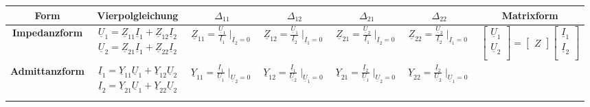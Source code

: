 \begin{table}
	\renewcommand{\arraystretch}{1.1}
	\begin{tabular}{| c | c | c | c | c | c | c |}
		\hline
			\textbf{Form}
			& \textbf{Vierpolgleichung} 
			& \textbf{$\Delta_{11}$} 
			& \textbf{$\Delta_{12}$}
			& \textbf{$\Delta_{21}$}
			& \textbf{$\Delta_{22}$}
			& \textbf{Matrixform}\\
		\hline
			\textbf{Impedanzform}
			& $ \begin{matrix}
					\underline{U}_{1}=\underline{Z}_{11}\underline{I}_{1}+\underline{Z}_{12}\underline{I}_{2}\\
					\underline{U}_{2}=\underline{Z}_{21}\underline{I}_{1}+\underline{Z}_{22}\underline{I}_{2}\\
				\end{matrix}$
			& $\underline{Z}_{11}=\frac{\underline{U}_{1}}{\underline{I}_{1}} \mid_{\underline{I}_2=0}$
			& $\underline{Z}_{12}=\frac{\underline{U}_{1}}{\underline{I}_{2}} \mid_{\underline{I}_1=0}$
			& $\underline{Z}_{21}=\frac{\underline{U}_{2}}{\underline{I}_{1}} \mid_{\underline{I}_2=0}$
			& $\underline{Z}_{22}=\frac{\underline{U}_{2}}{\underline{I}_{2}} \mid_{\underline{I}_1=0}$
			& $ \begin{bmatrix}
					\underline{U}_{1}\\
					\underline{U}_{2}\\
				\end{bmatrix}
				=
				\begin{bmatrix}
					Z
				\end{bmatrix}
				\begin{bmatrix}
					\underline{I}_{1}\\
					\underline{I}_{2}\\
				\end{bmatrix}$\\
		\hline
			\textbf{Admittanzform}
			& $ \begin{matrix}
					\underline{I}_{1}=\underline{Y}_{11}\underline{U}_{1}+\underline{Y}_{12}\underline{U}_{2}\\
					\underline{I}_{2}=\underline{Y}_{21}\underline{U}_{1}+\underline{Y}_{22}\underline{U}_{2}\\
				\end{matrix}$
			& $\underline{Y}_{11}=\frac{\underline{I}_{1}}{\underline{U}_{1}} \mid_{\underline{U}_2=0}$
			& $\underline{Y}_{12}=\frac{\underline{I}_{1}}{\underline{U}_{2}} \mid_{\underline{U}_1=0}$
			& $\underline{Y}_{21}=\frac{\underline{I}_{2}}{\underline{U}_{1}} \mid_{\underline{U}_2=0}$
			& $\underline{Y}_{22}=\frac{\underline{I}_{2}}{\underline{U}_{2}} \mid_{\underline{U}_1=0}$

\end{tabular}
\end{table}
